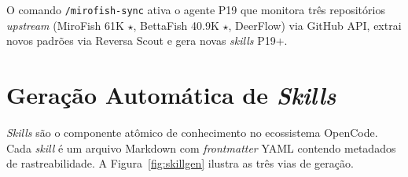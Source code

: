 \documentclass[
  article,
  12pt,
  oneside,
  a4paper,
  brazil,
  sumario=tradicional
]{abntex2}
\begin{document}
O comando \texttt{/mirofish-sync} ativa o agente P19 que monitora três repositórios \emph{upstream} (MiroFish 61K $\star$, BettaFish 40.9K $\star$, DeerFlow) via GitHub API, extrai novos padrões via Reversa Scout e gera novas \emph{skills} P19+.

\section{Geração Automática de \emph{Skills}}

\emph{Skills} são o componente atômico de conhecimento no ecossistema OpenCode. Cada \emph{skill} é um arquivo Markdown com \emph{frontmatter} YAML contendo metadados de rastreabilidade. A Figura~\ref{fig:skillgen} ilustra as três vias de geração.
\end{document}
